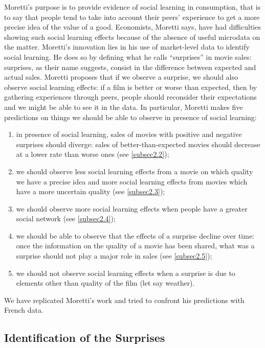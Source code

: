 Moretti's purpose is to provide evidence of social learning in consumption, that is to say that people tend to take into account their peers' experience to get a more precise idea of the value of a good. Economists, Moretti says, have had difficulties showing such social learning effects because of the absence of useful microdata on the matter. Moretti's innovation lies in his use of market-level data to identify social learning. He does so by defining what he calls ``surprises'' in movie sales: surprises, as their name suggests, consist in the difference between expected and actual sales. Moretti proposes that if we observe a surprise, we should also observe social learning effects: if a film is better or worse than expected, then by gathering experiences through peers, people should reconsider their expectations and we might be able to see it in the data. In particular, Moretti makes five predictions on things we should be able to observe in presence of social learning: \begin{enumerate}
	\item in presence of social learning, sales of movies with positive and negative surprises should diverge: sales of better-than-expected movies should decrease at a lower rate than worse ones (see \ref{subsec2.2}); 
	\item we should observe less social learning effects from a movie on which quality we have a precise idea and more social learning effects from movies which have a more uncertain quality (see \ref{subsec2.3});
	\item we should observe more social learning effects when people have a greater social network (see \ref{subsec2.4});
	\item we should be able to observe that the effects of a surprise decline over time: once the information on the quality of a movie has been shared, what was a surprise should not play a major role in sales (see \ref{subsec2.5});
	\item we should not observe social learning effects when a surprise is due to elements other than quality of the film (let say weather).
\end{enumerate}
We have replicated Moretti's work and tried to confront his predictions with French data.
\subsection{Identification of the Surprises}\label{subsec2.1}


